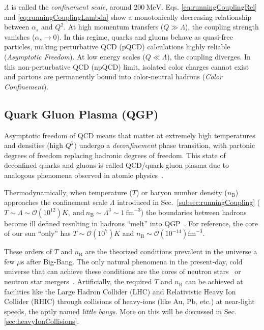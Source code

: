 \(\Lambda\) is called the \emph{confinement scale}, around \(200~\mathrm{MeV}\). Eqs. \ref{eq:runningCouplingRel} and \ref{eq:runningCouplingLambda} show a monotonically decreasing relationship between \(\alpha_s\) and \(Q^2\). At high momentum transfers (\(Q \gg \Lambda\)), the coupling strength vanishes ($\alpha_s \to 0$). In this regime, quarks and gluons behave as quasi-free particles, making perturbative QCD (pQCD) calculations highly reliable (\emph{Asymptotic Freedom}).  At low energy scales (\(Q \ll \Lambda\)), the coupling diverges. In this non-perturbative QCD (npQCD) limit, isolated color charges cannot exist and partons are permanently bound into color-neutral hadrons (\emph{Color Confinement}).

\subsection{Quark Gluon Plasma (QGP)}
\label{sec:QGPIntro}
Asymptotic freedom of QCD means that matter at extremely high temperatures and densities (high \(Q^2\)) undergo a \emph{deconfinement} phase transition, with partonic degrees of freedom replacing hadronic degrees of freedom. 
%
This state of deconfined quarks and gluons is called QCD/quark-gluon plasma due to analogous phenomena observed in atomic physics~\cite{SHURYAK198071}.

Thermodynamically, when temperature (\(T\)) or baryon number density (\(n_\mathrm{B}\)) approaches the confinement scale \(\Lambda\) introduced in Sec.~\ref{subsec:runningCoupling} (\(T \sim \Lambda \sim \mathcal{O}(10^{12})K,~\text{and}~n_\mathrm{B} \sim \Lambda^3 \sim 1~\text{fm}^{-3}\)) the boundaries between hadrons become ill defined resulting in hadrons ``melt'' into QGP~\cite{Fukushima_2010}.  
%
For reference, the core of our sun ``only'' has \(T\sim \mathcal{O}(10^{7})K\) and \(n_\mathrm{B}\sim\mathcal{O}(10^{-14})\text{fm}^{-3}\). 

These orders of \(T\) and \(n_\mathrm{B}\) are the theorized conditions prevalent in the universe a few \(\mu\mathrm{s}\) after Big-Bang. The only natural phenomena in the present-day, cold universe that can achieve these conditions are the cores of neutron stars~\cite{Annala_2020} or neutron star mergers~\cite{neutronStarMerger}. Artificially, the required  \(T\) and \(n_\mathrm{B}\) can be achieved at facilities like the Large Hadron Collider (LHC) and Relativistic Heavy Ion Collider (RHIC) through collisions of heavy-ions (like Au, Pb, etc.) at near-light speeds, the aptly named \emph{little bangs}. More on this will be discussed in Sec. \ref{sec:heavyIonCollisions}. 

